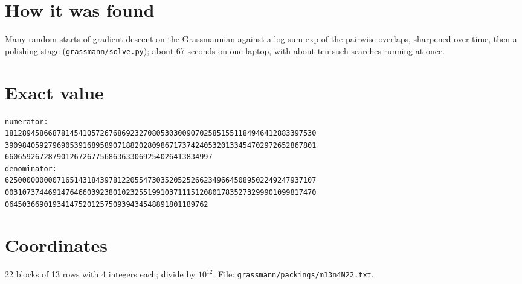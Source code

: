 \documentclass[11pt,a4paper]{article}
\begin{document}
\section{How it was found}
Many random starts of gradient descent on the Grassmannian against a log-sum-exp of the pairwise overlaps, sharpened over time, then a polishing stage (\texttt{grassmann/solve.py}); about 67 seconds on one laptop, with about ten such searches running at once.


\appendix
\section{Exact value}
{\small
\begin{verbatim}
numerator:
181289458668781454105726768692327080530300907025851551184946412883397530
390984059279690539168958907188202809867173742405320133454702972652867801
660659267287901267267756863633069254026413834997
denominator:
625000000000716514318439781220554730352052526623496645089502249247937107
003107374469147646603923801023255199103711151208017835273299901099817470
06450366901934147520125750939434548891801189762
\end{verbatim}}

\section{Coordinates}
22 blocks of 13 rows with 4 integers each; divide by $10^{12}$. File: \texttt{grassmann/packings/m13n4N22.txt}.
{\tiny
\begin{multicols}{3}
\end{multicols}}
\end{document}
